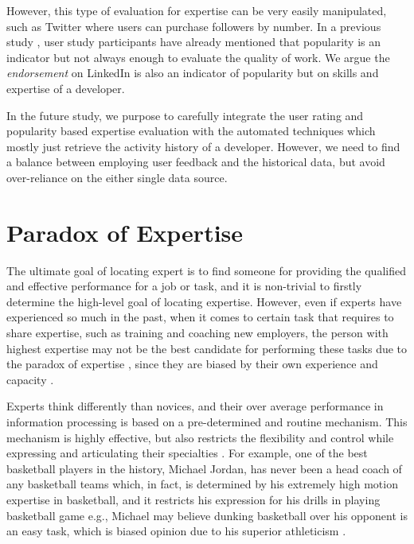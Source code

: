 However, this type of evaluation for expertise can be very easily manipulated,  such as Twitter where users can purchase followers by number. In a previous study \cite{marlow2013activity}, user study participants have already mentioned that popularity is an indicator but not always enough to evaluate the quality of work. We argue the \textit{endorsement} on LinkedIn is also an indicator of popularity but on skills and expertise of a developer.

In the future study, we purpose to carefully integrate the user rating and popularity based expertise evaluation with the automated techniques which mostly just retrieve the activity history of a developer. However, we need to find a balance between employing user feedback and the historical data, but avoid over-reliance on the either single data source.

\section{Paradox of Expertise}

The ultimate goal of locating expert is to find someone for providing the qualified and effective performance for a job or task, and it is non-trivial to firstly determine the high-level goal of locating expertise. However, even if experts have experienced so much in the past, when it comes to certain task that requires to share expertise, such as training and coaching new employers, the person with highest expertise may not be the best candidate for performing these tasks due to the paradox of expertise \cite{dror2011paradox}, since they are biased by their own experience and capacity \cite{liu2013expertise}.

Experts think differently than novices, and their over average performance in information processing is based on a pre-determined and routine mechanism. This mechanism is highly effective, but also restricts the flexibility and control while expressing and articulating their specialties \cite{dror2011paradox}. For example, one of the best basketball players in the history, Michael Jordan, has never been a head coach of any basketball teams which, in fact, is determined by his extremely high motion expertise in basketball, and it restricts his expression for his drills in playing basketball game e.g., Michael may believe dunking basketball over his opponent is an easy task, which is biased opinion due to his superior athleticism \cite{staff_nba.com_2017}.

